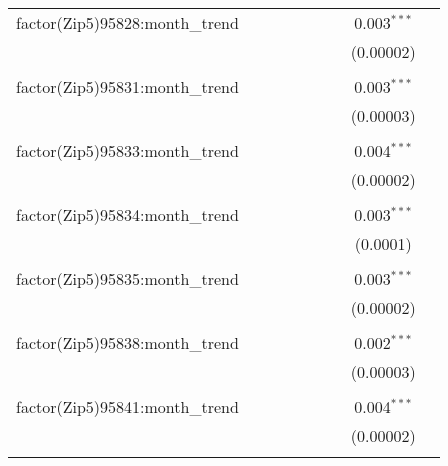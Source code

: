 \begin{table}[H]
{\begin{tabular}{@{\extracolsep{5pt}}lcccccccc}
  factor(Zip5)95828:month\_trend &  &  &  &  &  &  & 0.003$^{***}$ &  \\  

   &  &  &  &  &  &  & (0.00002) &  \\  

   & & & & & & & & \\  

  factor(Zip5)95831:month\_trend &  &  &  &  &  &  & 0.003$^{***}$ &  \\  

   &  &  &  &  &  &  & (0.00003) &  \\  

   & & & & & & & & \\  

  factor(Zip5)95833:month\_trend &  &  &  &  &  &  & 0.004$^{***}$ &  \\  

   &  &  &  &  &  &  & (0.00002) &  \\  

   & & & & & & & & \\  

  factor(Zip5)95834:month\_trend &  &  &  &  &  &  & 0.003$^{***}$ &  \\  

   &  &  &  &  &  &  & (0.0001) &  \\  

   & & & & & & & & \\  

  factor(Zip5)95835:month\_trend &  &  &  &  &  &  & 0.003$^{***}$ &  \\  

   &  &  &  &  &  &  & (0.00002) &  \\  

   & & & & & & & & \\  

  factor(Zip5)95838:month\_trend &  &  &  &  &  &  & 0.002$^{***}$ &  \\  

   &  &  &  &  &  &  & (0.00003) &  \\  

   & & & & & & & & \\  

  factor(Zip5)95841:month\_trend &  &  &  &  &  &  & 0.004$^{***}$ &  \\  

   &  &  &  &  &  &  & (0.00002) &  \\  

   & & & & & & & & \\  


\end{tabular}}
\end{table}
